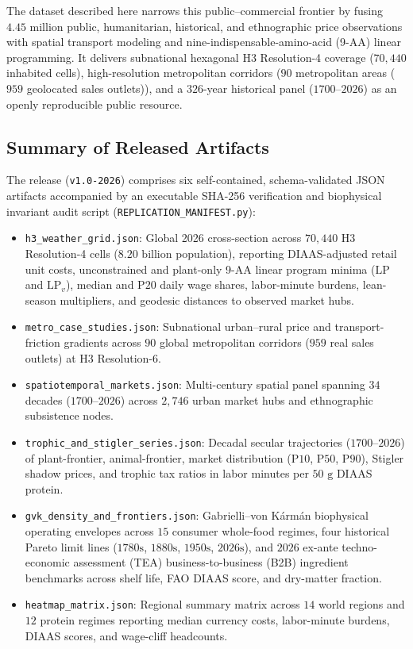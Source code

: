 \documentclass[11pt,a4paper]{article}
\begin{document}
The dataset described here narrows this public--commercial frontier by fusing $4.45\text{ million}$ public, humanitarian, historical, and ethnographic price observations with spatial transport modeling and nine-indispensable-amino-acid (9-AA) linear programming. It delivers subnational hexagonal H3 Resolution-4 coverage ($70{,}440$ inhabited cells), high-resolution metropolitan corridors ($90$ metropolitan areas ($959$ geolocated sales outlets)), and a $326$-year historical panel ($1700\text{--}2026$) as an openly reproducible public resource.

\subsection{Summary of Released Artifacts}
The release (\texttt{v1.0-2026}) comprises six self-contained, schema-validated JSON artifacts accompanied by an executable SHA-256 verification and biophysical invariant audit script (\texttt{REPLICATION\_MANIFEST.py}):
\begin{itemize}
    \item \texttt{h3\_weather\_grid.json}: Global 2026 cross-section across $70{,}440$ H3 Resolution-4 cells ($8.20\text{ billion}$ population), reporting DIAAS-adjusted retail unit costs, unconstrained and plant-only 9-AA linear program minima ($\text{LP}$ and $\text{LP}_v$), median and $\text{P20}$ daily wage shares, labor-minute burdens, lean-season multipliers, and geodesic distances to observed market hubs.
    \item \texttt{metro\_case\_studies.json}: Subnational urban--rural price and transport-friction gradients across $90$ global metropolitan corridors ($959$ real sales outlets) at H3 Resolution-6.
    \item \texttt{spatiotemporal\_markets.json}: Multi-century spatial panel spanning $34$ decades ($1700\text{--}2026$) across $2{,}746$ urban market hubs and ethnographic subsistence nodes.
    \item \texttt{trophic\_and\_stigler\_series.json}: Decadal secular trajectories ($1700\text{--}2026$) of plant-frontier, animal-frontier, market distribution ($\text{P10}$, $\text{P50}$, $\text{P90}$), Stigler shadow prices, and trophic tax ratios in labor minutes per $50\text{ g}$ DIAAS protein.
    \item \texttt{gvk\_density\_and\_frontiers.json}: Gabrielli--von K\'arm\'an biophysical operating envelopes across $15$ consumer whole-food regimes, four historical Pareto limit lines ($1780\text{s}$, $1880\text{s}$, $1950\text{s}$, $2026\text{s}$), and $2026$ ex-ante techno-economic assessment (TEA) business-to-business (B2B) ingredient benchmarks across shelf life, FAO DIAAS score, and dry-matter fraction.
    \item \texttt{heatmap\_matrix.json}: Regional summary matrix across $14$ world regions and $12$ protein regimes reporting median currency costs, labor-minute burdens, DIAAS scores, and wage-cliff headcounts.
\end{itemize}
\end{document}
